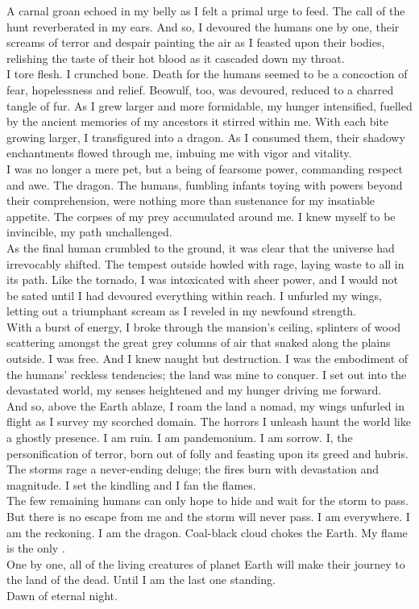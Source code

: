 A carnal groan echoed in my belly as I felt a primal urge to feed. The call of the hunt reverberated in my ears. And so, I devoured the humans one by one, their screams of terror and despair painting the air as I feasted upon their bodies, relishing the taste of their hot blood as it cascaded down my throat. \\
I tore flesh. I crunched bone. Death for the humans seemed to be a concoction of fear, hopelessness and relief. Beowulf, too, was devoured, reduced to a charred tangle of fur. As I grew larger and more formidable, my hunger intensified, fuelled by the ancient memories of my ancestors it stirred within me. With each bite growing larger, I transfigured into a dragon. As I consumed them, their shadowy enchantments flowed through me, imbuing me with vigor and vitality. \\
I was no longer a mere pet, but a being of fearsome power, commanding respect and awe. The dragon. The humans, fumbling infants toying with powers beyond their comprehension, were nothing more than sustenance for my insatiable appetite. The corpses of my prey accumulated around me. I knew myself to be invincible, my path unchallenged. \\

As the final human crumbled to the ground, it was clear that the universe had irrevocably shifted. The tempest outside howled with rage, laying waste to all in its path. Like the tornado, I was intoxicated with sheer power, and I would not be sated until I had devoured everything within reach. I unfurled my wings, letting out a triumphant scream as I reveled in my newfound strength. \\
With a burst of energy, I broke through the mansion's ceiling, splinters of wood scattering amongst the great grey columns of air that snaked along the plains outside. I was free. And I knew naught but destruction. I was the embodiment of the humans' reckless tendencies; the land was mine to conquer. I set out into the devastated world, my senses heightened and my hunger driving me forward. \\

And so, above the Earth ablaze, I roam the land a nomad, my wings unfurled in flight as I survey my scorched domain. The horrors I unleash haunt the world like a ghostly presence. I am ruin. I am pandemonium. I am sorrow. I, the personification of terror, born out of  folly and feasting upon its greed and hubris. The storms rage a never-ending deluge; the fires burn with devastation and magnitude. I set the kindling and I fan the flames. \\
The few remaining humans can only hope to hide and wait for the storm to pass. But there is no escape from me and the storm will never pass. I am everywhere. I am the reckoning. I am the dragon. Coal-black cloud chokes the Earth. My flame is the only . \\
One by one, all of the living creatures of planet Earth will make their journey to the land of the dead. Until I am the last one standing. \\

Dawn of eternal night. \\

